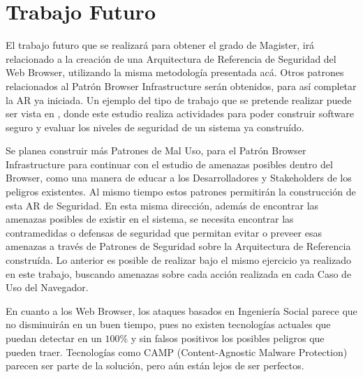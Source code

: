 \section{Trabajo Futuro}
El trabajo futuro que se realizará para obtener el grado de Magister, irá relacionado a la creación de una Arquitectura de Referencia de Seguridad del Web Browser, utilizando la misma metodología presentada acá. Otros patrones relacionados al Patrón Browser Infrastructure serán obtenidos, para así completar la AR ya iniciada. Un ejemplo del tipo de trabajo que se pretende realizar puede ser vista en \cite{fernandez2014security}, donde este estudio realiza actividades para poder construir software seguro y evaluar los niveles de seguridad de un sistema ya construído.

Se planea construir más Patrones de Mal Uso, para el Patrón Browser Infrastructure para continuar con el estudio de amenazas posibles dentro del Browser, como una manera de educar a los Desarrolladores y Stakeholders de los peligros existentes. Al mismo tiempo estos patrones permitirán la construcción de esta AR de Seguridad. En esta misma dirección, además de encontrar las amenazas posibles de existir en el sistema, se necesita encontrar las contramedidas o defensas de seguridad que permitan evitar o preveer esas amenazas a través de Patrones de Seguridad sobre la Arquitectura de Referencia construída. Lo anterior es posible de realizar bajo el mismo ejercicio ya realizado en este trabajo, buscando amenazas sobre cada acción realizada en cada Caso de Uso del Navegador.

En cuanto a los Web Browser, los ataques basados en Ingeniería Social parece que no disminuirán en un buen tiempo, pues no existen tecnologías actuales que puedan detectar en un \(100\%\) y sin falsos positivos los posibles peligros que pueden traer. Tecnologías como CAMP (Content-Agnostic Malware Protection) parecen ser parte de la solución, pero aún están lejos de ser perfectos.